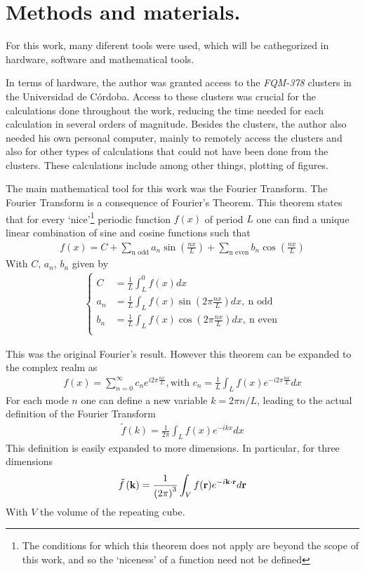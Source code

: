 \chapter{Methods and materials.}

For this work, many diferent tools were used, which will be cathegorized in hardware, software and mathematical tools. 

In terms of hardware, the author was granted access to the \textit{FQM-378} clusters in the Universidad de Córdoba. Access to these clusters was crucial for the calculations done throughout the work, reducing the time needed for each calculation in several orders of magnitude. Besides the clusters, the author also needed his own personal computer, mainly to remotely access the clusters and also for other types of calculations that could not have been done from the clusters. These calculations include among other things, plotting of figures. 

The main mathematical tool for this work was the Fourier Transform. The Fourier Transform is a consequence of Fourier's Theorem. This theorem states that for every `nice'\footnote{The conditions for which this theorem does not apply are beyond the scope of this work, and so the `niceness' of a function need not be defined} periodic function $f(x)$ of period $L$ one can find a unique linear combination of sine and cosine functions such that 
\begin{align}
	f(x) = C + \sum_\text{n odd} a_n \sin\left( \frac{nx}{L} \right) + \sum_{\text{n even}}^{} b_n \cos \left( \frac{nx}{L} \right) 
\end{align}
With $C $, $a_n$, $b_n$ given by 
\begin{align}
	\begin{cases}
		C &= \frac{1}{L} \int_{L}^{0} f(x) dx\\
		a_n &= \frac{1}{L} \int_{L}^{} f(x) \sin\left(  2\pi \frac{nx}{L} \right) dx,~\text{n odd}\\
		b_n &= \frac{1}{L} \int_{L}^{} f(x) \cos\left(  2\pi \frac{nx}{L} \right) dx,~\text{n even}\\
	\end{cases}
\end{align}

This was the original Fourier's result. However this theorem can be expanded to the complex realm as 
\begin{align}
	f(x) = \sum_{n=0}^{\infty} c_n e^{i 2\pi \frac{nx}{L}}, \text{with } c_n = \frac{1}{L}\int_{L}^{} f(x) e^{-i 2\pi \frac{nx}{L}}dx 
\end{align}
For each mode $n$ one can define a new variable $k=2\pi n /L$, leading to the actual definition of the Fourier Transform 
\begin{align}
	\tilde{f}(k) = \frac{1}{2\pi}\int_{L}^{}  f(x) e^{-i k x} dx
\end{align}
This definition is easily expanded to more dimensions. In particular, for three dimensions 
\begin{align}
	\tilde{f} \left( \textbf{k} \right) = \frac{1}{ \left( 2\pi \right) ^3} \int_{V}^{} f(\textbf{r}) e^{-i \textbf{k}\cdot \textbf{\textbf{r}}}d \textbf{r}
\end{align}
With $V$ the volume of the repeating cube. 

